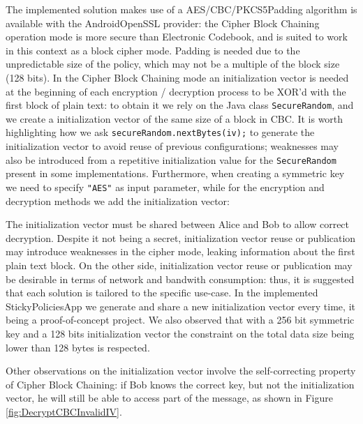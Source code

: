 The implemented solution makes use of a AES/CBC/PKCS5Padding  algorithm is available with the AndroidOpenSSL provider: the Cipher Block Chaining operation mode is more secure than Electronic Codebook, and is suited to work in this context as a block cipher mode. Padding is needed due to the unpredictable size of the policy, which may not be a multiple of the block size (128 bits). In the Cipher Block Chaining mode an initialization vector is needed at the beginning of each encryption / decryption process to be XOR'd with the first block of plain text: to obtain it we rely on the Java class \texttt{SecureRandom}, and we create a initialization vector of the same size of a block in CBC. It is worth highlighting how we ask \texttt{secureRandom.nextBytes(iv);} to generate the initialization vector to avoid reuse of previous configurations; weaknesses  may also be introduced from a repetitive initialization value for the \texttt{SecureRandom} present in some implementations. Furthermore, when creating a symmetric key we need to specify \texttt{"AES"} as input parameter, while for the encryption and decryption methods we add the initialization vector:



The initialization vector must be shared between Alice and Bob to allow correct decryption. Despite it not being a secret, initialization vector reuse or publication may introduce weaknesses in the cipher mode, leaking information about the first plain text block. On the other side, initialization vector reuse or publication may be desirable in terms of network and bandwith consumption: thus, it is suggested that each solution is tailored to the specific use-case. In the implemented StickyPoliciesApp we generate and share a new initialization vector every time, it being a proof-of-concept project. We also observed that with a 256 bit symmetric key and a 128 bits initialization vector the constraint on the total data size being lower than 128 bytes is respected.

Other observations on the initialization vector involve the self-correcting property of Cipher Block Chaining: if Bob knows the correct key, but not the initialization vector, he will still be able to access part of the message, as shown in Figure \ref{fig:DecryptCBCInvalidIV}.

